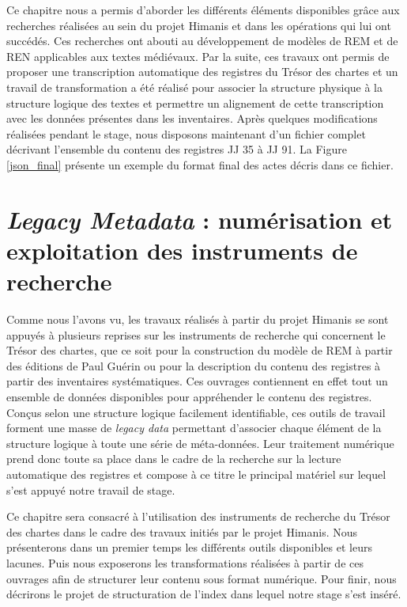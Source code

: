 \documentclass[a4paper,12pt,twoside]{book}
\begin{document}
	Ce chapitre nous a permis d'aborder les différents éléments disponibles grâce aux recherches réalisées au sein du projet Himanis et dans les opérations qui lui ont succédés. Ces recherches ont abouti au développement de modèles de REM et de REN applicables aux textes médiévaux. Par la suite, ces travaux ont permis de proposer une transcription automatique des registres du Trésor des chartes et un travail de transformation a été réalisé pour associer la structure physique à la structure logique des textes et permettre un alignement de cette transcription avec les données présentes dans les inventaires. Après quelques modifications réalisées pendant le stage, nous disposons maintenant d'un fichier complet décrivant l'ensemble du contenu des registres JJ 35 à JJ 91. La Figure \ref{json_final} présente un exemple du format final des actes décris dans ce fichier.
	
	
	\chapter{\textit{Legacy Metadata} : numérisation et exploitation des instruments de recherche}
	
	Comme nous l'avons vu, les travaux réalisés à partir du projet Himanis se sont appuyés à plusieurs reprises sur les instruments de recherche qui concernent le Trésor des chartes, que ce soit pour la construction du modèle de REM à partir des éditions de Paul Guérin ou pour la description du contenu des registres à partir des inventaires systématiques. Ces ouvrages contiennent en effet tout un ensemble de données disponibles pour appréhender le contenu des registres. Conçus selon une structure logique facilement identifiable, ces outils de travail forment une masse de \textit{legacy data} permettant d'associer chaque élément de la structure logique à toute une série de méta-données. Leur traitement numérique prend donc toute sa place dans le cadre de la recherche sur la lecture automatique des registres et compose à ce titre le principal matériel sur lequel s'est appuyé notre travail de stage.
	
	Ce chapitre sera consacré à l'utilisation des instruments de recherche du Trésor des chartes dans le cadre des travaux initiés par le projet Himanis. Nous présenterons dans un premier temps les différents outils disponibles et leurs lacunes. Puis nous exposerons les transformations réalisées à partir de ces ouvrages afin de structurer leur contenu sous format numérique. Pour finir, nous décrirons le projet de structuration de l'index dans lequel notre stage s'est inséré.
	
\end{document}
